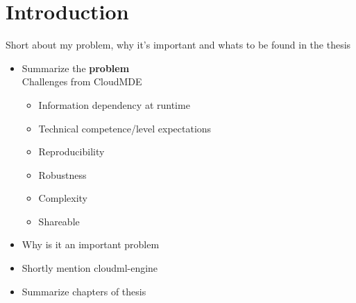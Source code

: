 \section{Introduction}

Short about my problem, why it's important and whats to be found in the thesis 

\begin{itemize}
  \item Summarize the \textbf{problem} \\
      Challenges from CloudMDE
    \begin{itemize}
      \item Information dependency at runtime
      \item Technical competence/level expectations
      \item Reproducibility
      \item Robustness
      \item Complexity
      \item Shareable
    \end{itemize}
  \item Why is it an important problem
  \item Shortly mention cloudml-engine
  \item Summarize chapters of thesis
\end{itemize}
